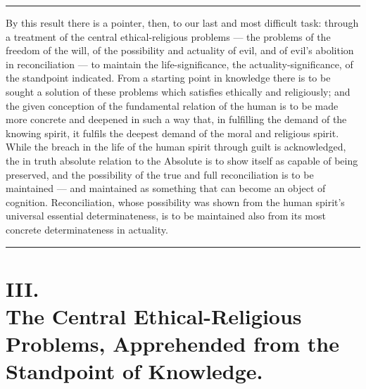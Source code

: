 \documentclass[12pt,a4paper]{book}
\begin{document}
\begin{center}\rule{2cm}{0.4pt}\end{center}

By this result there is a pointer, then, to our last and most difficult task:
through a treatment of the central ethical-religious problems --- the problems
of the freedom of the will, of the possibility and actuality of evil, and of
evil's abolition in reconciliation --- to maintain the life-significance, the
actuality-significance, of the standpoint indicated. From a starting point in
knowledge there is to be sought a solution of these problems which satisfies
ethically and religiously; and the given conception of
the fundamental relation of the human is to be made more concrete and deepened
in such a way that, in fulfilling the demand of the knowing spirit, it
fulfils the deepest demand of the moral and religious spirit. While the breach
in the life of the human spirit through guilt is acknowledged, the in truth
absolute relation to the Absolute is to show itself as capable of being
preserved, and the possibility of the true and full reconciliation is to be
maintained --- and maintained as something that can become an object of
cognition. Reconciliation, whose possibility was shown from the human spirit's
universal essential determinateness, is to be maintained also from its most
concrete determinateness in actuality.

\begin{center}\rule{2cm}{0.4pt}\end{center}

\chapter*{III.\\ The Central Ethical-Religious Problems, Apprehended from the Standpoint of Knowledge.}
\end{document}
